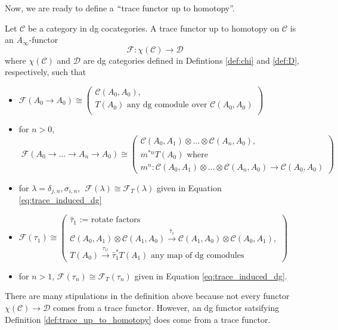 %
Now, we are ready to define a $``$trace functor up 
to homotopy''.
%
\begin{defn} \label{def:trace_up_to_homotopy}
Let $\mathcal{C}$ be a category in dg 
cocategories. A trace functor up to homotopy on 
$\mathcal{C}$ is an $A_\infty$-functor 
$$\mathcal{F}: \chi(\mathcal{C}) \to \mathcal{D}$$
where $\chi(\mathcal{C})$ and $\mathcal{D}$ are 
dg categories defined in Defintions \ref{def:chi} 
and \ref{def:D}, respectively, such that
\begin{itemize}
	\item $\mathcal{F}(A_0 \to A_0) \cong 
	\begin{pmatrix}
		\mathcal{C}(A_0,A_0),\\
		T(A_0) \textrm{ any dg comodule over }\mathcal{C}(A_0,A_0)\\
	\end{pmatrix}$
	\item for $n>0$,$\; \mathcal{F}
	(A_0 \to \dots \to A_n \to A_0) \cong	
	\begin{pmatrix}
		\mathcal{C}(A_0,A_1) \otimes \dots \otimes \mathcal{C}(A_n,A_0),\\
		m^{*n} T(A_0) \textrm{ where }\\
		m^n: \mathcal{C}(A_0,A_1) \otimes \dots \otimes \mathcal{C}(A_n,A_0) \to \mathcal{C}(A_0,A_0)
	\end{pmatrix}$
	\item for $\lambda = \delta_{j,n}, \sigma_{i,n}$,  
	$\; \mathcal{F}(\lambda) \cong 
	\mathcal{F}_T(\lambda)$ given in Equation \ref{eq:trace_induced_dg}
	\item $\mathcal{F}(\tau_1) \cong 
	\begin{pmatrix}
		\textrm{$\hat{\tau}_1$ := rotate factors}\\
		\mathcal{C}(A_0,A_1) \otimes \mathcal{C}(A_1,A_0)
		\xrightarrow{\hat{\tau}_1}
		\mathcal{C}(A_1,A_0) \otimes \mathcal{C}(A_0,A_1),\\
		T(A_0)
		\xrightarrow{\tau_{1!}}
		\hat{\tau}_1^* T(A_1) \textrm{ any map of dg comodules}
	\end{pmatrix}$
	\item for $n>1$, $\mathcal{F}(\tau_n) \cong 
	\mathcal{F}_T(\tau_n)$ given in Equation \ref{eq:trace_induced_dg}.
\end{itemize}
\end{defn}
There are many stipulations in the definition above 
because not every functor $\chi(\mathcal{C}) \to \mathcal{D}$
comes from a trace functor. However, an dg functor 
satsifying Definition \ref{def:trace_up_to_homotopy} 
does come from a trace functor.















